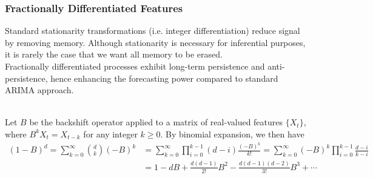 \subsubsection{Fractionally Differentiated Features}

Standard stationarity transformations (i.e. integer differentiation) reduce signal by removing memory. Although stationarity is necessary for inferential purposes, it is rarely the case that we want all memory to be erased.\\
Fractionally differentiated processes exhibit long-term persistence and anti-persistence, hence enhancing the forecasting power compared to standard ARIMA approach.

\begin{definition} \\
Let $B$ be the backshift operator applied to a matrix of real-valued features $\{X_t \}$, where $B^k X_t = X_{t-k}$ for any integer $k \geq 0$. By binomial expansion, we then have
\begin{align}
(1-B)^d = \sum\limits_{k=0}^{\infty} \binom{d}{k} (-B)^k &= \sum\limits_{k=0}^{\infty} \prod\limits_{i=0}^{k-1} (d-i) \frac{(-B)^k}{k!} = \sum\limits_{k=0}^{\infty} (-B)^k \prod\limits_{i=0}^{k-1} \frac{d-i}{k-i} \nonumber \\
&= 1 - dB + \frac{d(d-1)}{2!} B^2 - \frac{d(d-1)(d-2)}{3!} B^3 + \cdots \nonumber 
\end{align}
\end{definition}

